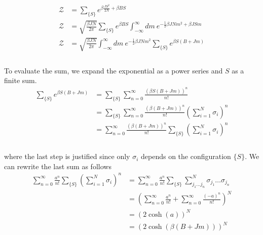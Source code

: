 \documentclass[]{article}
\begin{document}
\begin{enumerate}[1.]
\begin{enumerate}[i.]
\begin{equation}
\begin{aligned}
\mathcal{Z} & =   \sum_{ \{ S \} } e^{   \beta \frac{ J S^2 }{ 2 N}  +  \beta B S   }\\
%
\mathcal{Z} & =   \sqrt{ \frac{ \beta J N}{ 2 \pi }   }  \sum_{ \{ S \} } e^{  \beta B S   }    \int_{-\infty}^{\infty} dm \: e^{ -  \frac{1}{2} \beta J N m^2 + \beta J S m} \\
%
\mathcal{Z} & =   \sqrt{ \frac{ \beta J N}{ 2 \pi }   }   \int_{-\infty}^{\infty} dm \:     e^{ -  \frac{1}{2} \beta J N m^2 } \sum_{ \{ S \} } e^{  \beta S ( B + Jm )   }   \\
%
\end{aligned}
\end{equation} \\

To evaluate the sum, we expand the exponential as a power series and $S$ as a finite sum. \\

\begin{equation}
\begin{aligned}
 \sum_{ \{ S \} } e^{  \beta S ( B + Jm )   } & = \sum_{ \{ S \} } \sum_{n = 0 }^{\infty } \frac{ ( \beta S ( B + Jm )  )^n }{n!}   \\
%
& = \sum_{ \{ S \} } \sum_{n = 0 }^{\infty } \frac{ ( \beta  ( B + Jm )  )^n }{n!} \left(  \sum_{ i = 1}^{N} \sigma_i  \right)^n  \\
%
& =  \sum_{n = 0 }^{\infty } \frac{ ( \beta  ( B + Jm )  )^n }{n!} \sum_{ \{ S \} } \left(  \sum_{ i = 1}^{N} \sigma_i  \right)^n  \\
\end{aligned}
\end{equation} \\

where the last step is justified since only $\sigma_i$ depends on the configuration $\{ S \}$. We can rewrite the last sum as follows \\

\begin{equation}
\begin{aligned}
\sum_{n = 0 }^{\infty } \frac{ a^n }{n!} \sum_{ \{ S \} } \left(  \sum_{ i = 1 }^{N} \sigma_i  \right)^n  & =  \sum_{n = 0 }^{\infty } \frac{ a^n }{n!} \sum_{ \{ S \} }  \sum_{ j_1 \dots j_n }^{N} \sigma_{ j_1 } \dots \sigma_{ j_n }   \\
%
& =  \left( \sum_{n = 0 }^{\infty } \frac{ a^n }{n!} + \sum_{n = 0 }^{\infty } \frac{ (-a)^n }{n!}  \right)^N   \\
%
& =  \left(2 \cosh( a) \right)^N   \\
%
& =  \left(2 \cosh(  \beta  ( B + Jm )  ) \right)^N   \\
\end{aligned}
\end{equation} \\


\end{enumerate}
\end{enumerate}
\end{document}
